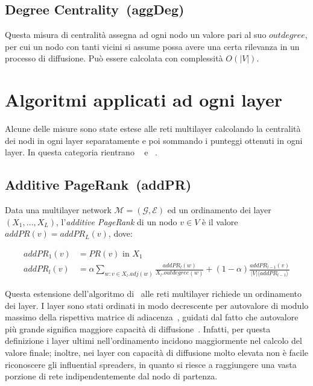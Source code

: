 \subsection{Degree Centrality~(aggDeg)}
Questa misura di centralità assegna ad ogni nodo un valore pari al suo $\mathit{outdegree}$, 
per cui un nodo con tanti vicini si assume possa avere una certa rilevanza in un 
processo di diffusione.
Può essere calcolata con complessità $O(|V|)$.

\section{Algoritmi applicati ad ogni layer}
Alcune delle misure sono state estese alle reti multilayer calcolando la centralità
dei nodi in ogni layer separatamente e poi sommando i punteggi ottenuti in ogni layer.
In questa categoria rientrano \emph{\addPageRank}~\cite{halu:addpagerank} 
e \emph{\sumCore}~\cite{basaras:infspmul}.

\subsection{Additive PageRank~(addPR)}
\begin{definizione}[\addPageRank]
    Data una multilayer network $\mathcal{M}=(\mathcal{G}, \mathcal{E})$ 
    ed un ordinamento dei layer $(X_1, \dots, X_{L})$, l'\emph{additive PageRank}
    di un nodo $v \in V$ è il valore 
    $\mathit{addPR}(v) = \mathit{addPR}_L(v)$, dove:

    \begin{equation*}
        \begin{split}
\mathit{addPR}_1(v)&= \mathit{PR}(v) \text{ in } X_1 \\
\mathit{addPR}_l(v)&= \alpha \sum_{w : v \in X_l.\mathit{adj}(w)} 
            \frac{\mathit{addPR}_l(w)}{X_l.\mathit{outdegree}(w)} + 
            (1-\alpha)\frac{\mathit{addPR}_{l-1}(v)}{|V| \langle \mathit{addPR}_{l-1} \rangle}
        \end{split}
    \end{equation*}

\end{definizione}

Questa estensione dell'algoritmo di \PageRank\ alle reti multilayer richiede un ordinamento
dei layer. I layer sono stati ordinati in modo decrescente per autovalore di modulo massimo della rispettiva matrice di adiacenza~\cite{basaras:infspmul}, 
guidati dal fatto che autovalore più grande significa maggiore capacità di diffusione~\cite{wang:eigenv}.
Infatti, per questa definizione i layer ultimi nell'ordinamento incidono maggiormente nel calcolo del valore 
finale; inoltre, nei layer con capacità di diffusione molto elevata non è facile riconoscere gli influential spreaders, in quanto
si riesce a raggiungere una vasta porzione di rete indipendentemente dal nodo di partenza.  

